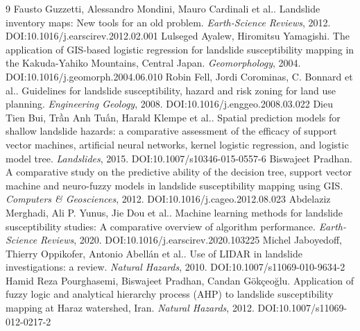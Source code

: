 \documentclass[11pt]{article}
\begin{document}
\begin{thebibliography}{9}
 Fausto Guzzetti, Alessandro Mondini, Mauro Cardinali et al.. Landslide inventory maps: New tools for an old problem. \emph{Earth-Science Reviews}, 2012. DOI:10.1016/j.earscirev.2012.02.001
 Lulseged Ayalew, Hiromitsu Yamagishi. The application of GIS-based logistic regression for landslide susceptibility mapping in the Kakuda-Yahiko Mountains, Central Japan. \emph{Geomorphology}, 2004. DOI:10.1016/j.geomorph.2004.06.010
 Robin Fell, Jordi Corominas, C. Bonnard et al.. Guidelines for landslide susceptibility, hazard and risk zoning for land use planning. \emph{Engineering Geology}, 2008. DOI:10.1016/j.enggeo.2008.03.022
 Dieu Tien Bui, Trần Anh Tuấn, Harald Klempe et al.. Spatial prediction models for shallow landslide hazards: a comparative assessment of the efficacy of support vector machines, artificial neural networks, kernel logistic regression, and logistic model tree. \emph{Landslides}, 2015. DOI:10.1007/s10346-015-0557-6
 Biswajeet Pradhan. A comparative study on the predictive ability of the decision tree, support vector machine and neuro-fuzzy models in landslide susceptibility mapping using GIS. \emph{Computers \& Geosciences}, 2012. DOI:10.1016/j.cageo.2012.08.023
 Abdelaziz Merghadi, Ali P. Yunus, Jie Dou et al.. Machine learning methods for landslide susceptibility studies: A comparative overview of algorithm performance. \emph{Earth-Science Reviews}, 2020. DOI:10.1016/j.earscirev.2020.103225
 Michel Jaboyedoff, Thierry Oppikofer, Antonio Abellán et al.. Use of LIDAR in landslide investigations: a review. \emph{Natural Hazards}, 2010. DOI:10.1007/s11069-010-9634-2
 Hamid Reza Pourghasemi, Biswajeet Pradhan, Candan Gökçeoğlu. Application of fuzzy logic and analytical hierarchy process (AHP) to landslide susceptibility mapping at Haraz watershed, Iran. \emph{Natural Hazards}, 2012. DOI:10.1007/s11069-012-0217-2
\end{thebibliography}
\end{document}
